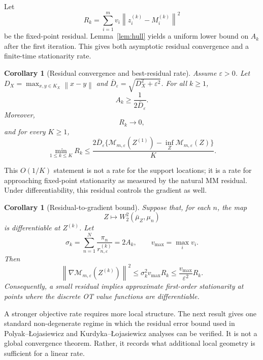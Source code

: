 \documentclass[pdflatex,sn-mathphys-ay]{sn-jnl}%
\theoremstyle{thmstyleone}%
\newtheorem{corollary}[theorem]{Corollary}
\theoremstyle{thmstyletwo}%
\theoremstyle{thmstylethree}%
\newcommand{\calM}{\mathcal M}
\newcommand{\eps}{\varepsilon}
\newcommand{\barmu}{\bar\mu}
\newcommand{\norm}[1]{\left\lVert #1\right\rVert}
\newcommand{\PLoja}{Polyak--\L{}ojasiewicz\xspace}
\newcommand{\KLoja}{Kurdyka--\L{}ojasiewicz\xspace}
\begin{document}
Let
\[
    R_k=\sum_{i=1}^m v_i\norm{z_i^{(k)}-M_i^{(k)}}^2
\]
be the fixed-point residual. Lemma~\ref{lem:hull} yields a uniform lower bound on \(A_k\) after the first iteration. This gives both asymptotic residual convergence and a finite-time stationarity rate.

\begin{corollary}[Residual convergence and best-residual rate]\label{cor:residual}
Assume \(\eps>0\). Let \(D_X=\max_{x,y\in K_X}\norm{x-y}\) and \(\bar D_\eps=\sqrt{D_X^2+\eps^2}\). For all \(k\ge1\),
\[
    A_k\ge \frac{1}{2\bar D_\eps}.
\]
Moreover,
\[
    R_k\to0,
\]
and for every \(K\ge1\),
\begin{equation}\label{eq:res-rate}
    \min_{1\le k\le K} R_k
    \le
    \frac{2\bar D_\eps\{\calM_{m,\eps}(Z^{(1)})-\inf_Z\calM_{m,\eps}(Z)\}}{K}.
\end{equation}
\end{corollary}

This \(O(1/K)\) statement is not a rate for the support locations; it is a rate for approaching fixed-point stationarity as measured by the natural MM residual. Under differentiability, this residual controls the gradient as well.

\begin{corollary}[Residual-to-gradient bound]\label{cor:gradient-residual}
Suppose that, for each \(n\), the map
\[
    Z\mapsto W_2^2(\barmu_Z,\mu_n)
\]
is differentiable at \(Z^{(k)}\). Let
\[
    \sigma_k=\sum_{n=1}^N\frac{\pi_n}{r_{n,\eps}^{(k)}}=2A_k,
    \qquad
    v_{\max}=\max_i v_i.
\]
Then
\begin{equation}\label{eq:grad-residual}
    \norm{\nabla \calM_{m,\eps}(Z^{(k)})}^2
    \le \sigma_k^2 v_{\max} R_k
    \le \frac{v_{\max}}{\eps^2}R_k .
\end{equation}
Consequently, a small residual implies approximate first-order stationarity at points where the discrete OT value functions are differentiable.
\end{corollary}

A stronger objective rate requires more local structure. The next result gives one standard non-degenerate regime in which the residual error bound used in \PLoja and \KLoja analyses \citep{polyak_1963_GradientMethodsMinimisation,lojasiewicz_1963_ProprieteTopologiqueSousensembles,attouch_2013_ConvergenceDescentMethods,bolte_2014_ProximalAlternatingLinearized} can be verified. It is not a global convergence theorem. Rather, it records what additional local geometry is sufficient for a linear rate.
\end{document}
